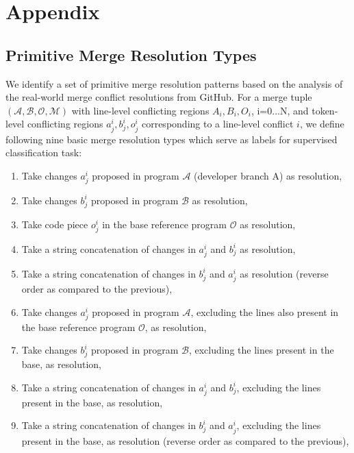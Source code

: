 \section{Appendix}

\label{sec:appendix}

\subsection{Primitive Merge Resolution Types}
\label{sec:merge_types}

We identify a set of primitive merge resolution patterns based on the analysis of the real-world merge conflict resolutions from GitHub. For a merge tuple $(\mathcal{A}, \mathcal{B}, \mathcal{O}, \mathcal{M})$ with line-level conflicting regions $A_i, B_i, O_i$, i=0...N, and token-level conflicting regions $a^{i}_{j}, b^{i}_{j}, o^{i}_{j}$ corresponding to a line-level conflict $i$, we define following nine basic merge resolution types which serve as labels for supervised classification task:
\begin{enumerate}
\item{Take changes $a^{i}_{j}$ proposed in program $\mathcal{A}$ (developer branch A) as resolution,}
\item{Take changes $b^{i}_{j}$ proposed in program $\mathcal{B}$ as resolution,}
\item{Take code piece $o^{i}_{j}$ in the base reference program $\mathcal{O}$ as resolution,}
\item{Take a string concatenation of changes in $a^{i}_{j}$ and $b^{i}_{j}$ as resolution,}
\item{Take a string concatenation of changes in $b^{i}_{j}$ and $a^{i}_{j}$ as resolution (reverse order as compared to the previous),}
\item{Take changes $a^{i}_{j}$ proposed in program $\mathcal{A}$, excluding the lines also present in the base reference program $\mathcal{O}$, as resolution,}
\item{Take changes $b^{i}_{j}$ proposed in program $\mathcal{B}$, excluding the lines present in the base, as resolution,}
\item{Take a string concatenation of changes in $a^{i}_{j}$ and $b^{i}_{j}$, excluding the lines present in the base, as resolution,}
\item{Take a string concatenation of changes in $b^{i}_{j}$ and $a^{i}_{j}$, excluding the lines present in the base, as resolution (reverse order as compared to the previous),}
\end{enumerate}

